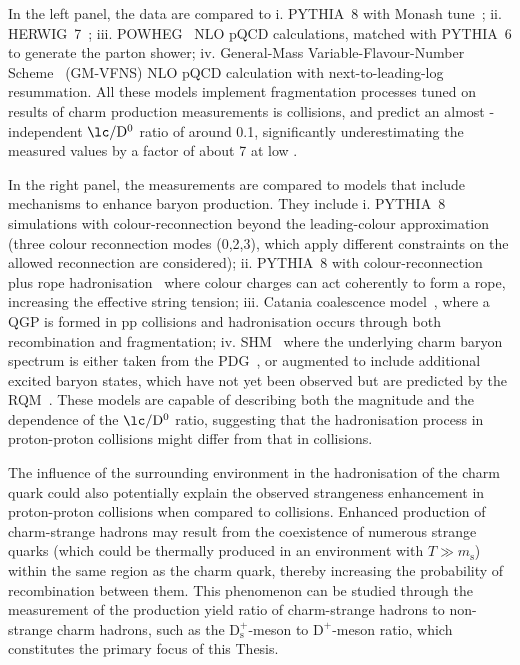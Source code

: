 In the left panel, the data are compared to i. PYTHIA~8 with Monash tune~\cite{Skands:2014pea}; ii. HERWIG~7~\cite{Bellm:2015jjp}; iii. POWHEG~\cite{Frixione:2007nw} NLO pQCD calculations, matched with PYTHIA~6 to generate the parton shower; iv. General-Mass Variable-Flavour-Number Scheme~\cite{Kniehl:2005mk} (GM-VFNS) NLO pQCD calculation with next-to-leading-log resummation. All these models implement fragmentation processes tuned on results of charm production measurements is \ee collisions, and predict an almost \pt-independent $\mathrm{\lc/D^0}$ ratio of around 0.1, significantly underestimating the measured values by a factor of about 7 at low \pt.

In the right panel, the measurements are compared to models that include mechanisms to enhance baryon production. They include i. PYTHIA~8 simulations with colour-reconnection beyond the leading-colour approximation~\cite{Christiansen:2015yqa} (three colour reconnection modes (0,2,3), which apply different constraints on the allowed reconnection are considered); ii. PYTHIA~8 with colour-reconnection plus rope hadronisation~\cite{Bierlich:2014xba} where colour charges can act coherently to form a rope, increasing the effective string tension; iii. Catania coalescence model~\cite{Minissale:2020bif}, where a QGP is formed in pp collisions and hadronisation occurs through both recombination and fragmentation; iv. SHM~\cite{Braun-Munzinger:2003pwq} where the underlying charm baryon spectrum is either taken from the PDG~\cite{pdg}, or augmented to include additional excited baryon states, which have not yet been observed but are predicted by the RQM~\cite{Ebert:2011kk}. These models are capable of describing both the magnitude and the \pt dependence of the $\mathrm{\lc/D^0}$ ratio, suggesting that the hadronisation process in proton-proton collisions might differ from that in \ee collisions.

The influence of the surrounding environment in the hadronisation of the charm quark could also potentially explain the observed strangeness enhancement in proton-proton collisions when compared to \ee collisions. Enhanced production of charm-strange hadrons may result from the coexistence of numerous strange quarks (which could be thermally produced in an environment with $T \gg m_\mathrm{s}$) within the same region as the charm quark, thereby increasing the probability of recombination between them. This phenomenon can be studied through the measurement of the production yield ratio of charm-strange hadrons to non-strange charm hadrons, such as the $\mathrm{D_s^+}$-meson to $\mathrm{D^+}$-meson ratio, which constitutes the primary focus of this Thesis.